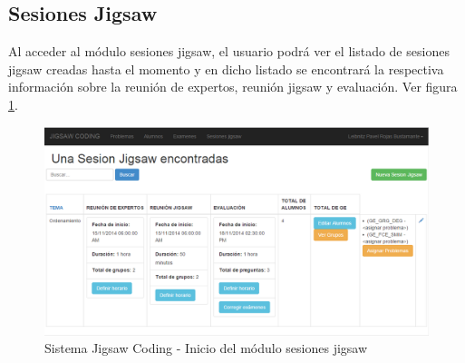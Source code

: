\subsection{Sesiones Jigsaw}
Al acceder al módulo sesiones jigsaw, el usuario podrá ver el listado de sesiones jigsaw creadas hasta el momento y en dicho listado se encontrará la respectiva información sobre la reunión de expertos, reunión jigsaw y evaluación. Ver figura \ref{fig:sesionesjigsaw_inicio}.

\begin{figure}[h!]
\centering
\caption[SJC Sesiones Jigsaw]{Sistema Jigsaw Coding - Inicio del módulo sesiones jigsaw}
\label{fig:sesionesjigsaw_inicio}
\includegraphics[scale=0.5]{figuras/usodelsistema/docente/sesionesjigsaw_inicio}
\end{figure}
\clearpage
